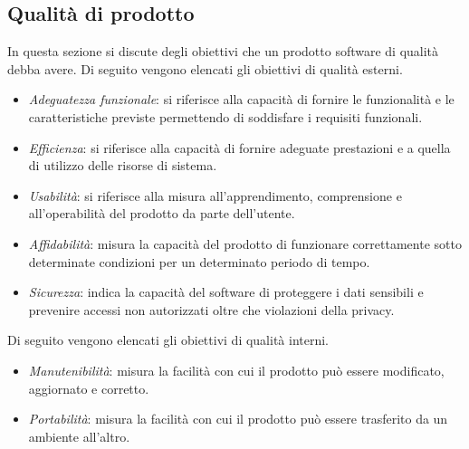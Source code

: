 \subsection{Qualità di prodotto}
In questa sezione si discute degli obiettivi che un prodotto software di qualità debba avere.
Di seguito vengono elencati gli obiettivi di qualità esterni.
\begin{itemize}
    \item \emph{Adeguatezza funzionale}:
    si riferisce alla capacità di fornire le funzionalità e le caratteristiche previste permettendo di soddisfare i requisiti funzionali.
    \item \emph{Efficienza}:
    si riferisce alla capacità di fornire adeguate prestazioni e a quella di utilizzo delle risorse di sistema.
    \item \emph{Usabilità}:
    si riferisce alla misura all'apprendimento, comprensione e all'operabilità del prodotto da parte dell'utente.
    \item \emph{Affidabilità}:
    misura la capacità del prodotto di funzionare correttamente sotto determinate condizioni per un determinato periodo di tempo.
    \item \emph{Sicurezza}:
    indica la capacità del software di proteggere i dati sensibili e prevenire accessi non autorizzati oltre che violazioni della privacy.
\end{itemize}
Di seguito vengono elencati gli obiettivi di qualità interni.
\begin{itemize}
    \item \emph{Manutenibilità}:
    misura la facilità con cui il prodotto può essere modificato, aggiornato e corretto.
    \item \emph{Portabilità}:
    misura la facilità con cui il prodotto può essere trasferito da un ambiente all'altro.
\end{itemize}

